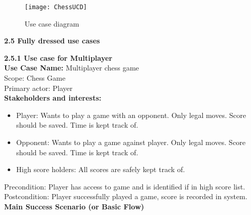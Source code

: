 \documentclass{article}
\begin{document}
\begin{figure}[h]
		\texttt{[image: ChessUCD]}
	\caption{Use case diagram }
	
\end{figure}





\begin{flushleft}
\vspace{5mm}	
\textbf{2.5	Fully dressed use cases}\\
\vspace{3mm}
	
\textbf{2.5.1	Use case for Multiplayer}\\
\vspace{3mm}
	\textbf {Use Case Name:} Multiplayer chess game\\
	\vspace{1mm}
	Scope: Chess Game\\
	\vspace{1mm}
	Primary actor: Player\\
	\vspace{1mm}
	\textbf{Stakeholders and interests:}\\
	\begin{itemize}
	
		\item Player: Wants to play a game with an opponent. Only legal moves. Score should be saved. Time is kept track of.\\
	
		\item Opponent: Wants to play a game against player. Only legal moves. Score should be saved. Time is kept track of.\\
	
		\item High score holders: All scores are safely kept track of.
		
	\end{itemize}
	
	Precondition: Player has access to game and is identified if in high score list.\\
	\vspace{1mm}
	Postcondition: Player successfully played a game, score is recorded in system.\\
	\vspace{2mm}
	\textbf{Main Success Scenario (or Basic Flow)}\\
	
	\begin{enumerate}
	

\end{enumerate}
\end{flushleft}
\end{document}
